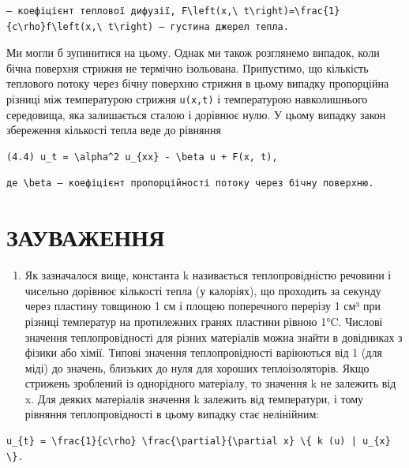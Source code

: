 \documentclass[
  ukrainian,
]{article}
\providecommand{\tightlist}{%
  \setlength{\itemsep}{0pt}\setlength{\parskip}{0pt}}
\begin{document}
\begin{verbatim}
— коефіцієнт теплової дифузії, F\left(x,\ t\right)=\frac{1}{c\rho}f\left(x,\ t\right) — густина джерел тепла.
\end{verbatim}

Ми могли б зупинитися на цьому. Однак ми також розглянемо випадок, коли
бічна поверхня стрижня не термічно ізольована. Припустимо, що кількість
теплового потоку через бічну поверхню стрижня в цьому випадку
пропорційна різниці між температурою стрижня \texttt{u(x,t)} і
температурою навколишнього середовища, яка залишається сталою і дорівнює
нулю. У цьому випадку закон збереження кількості тепла веде до рівняння

\begin{verbatim}
(4.4) u_t = \alpha^2 u_{xx} - \beta u + F(x, t),
\end{verbatim}

\begin{verbatim}
де \beta — коефіцієнт пропорційності потоку через бічну поверхню.
\end{verbatim}

\section{ЗАУВАЖЕННЯ}\label{ux437ux430ux443ux432ux430ux436ux435ux43dux43dux44f-3}

\begin{enumerate}
\def\labelenumi{\arabic{enumi}.}
\tightlist
\item
  Як зазначалося вище, константа k називається теплопровідністю речовини
  і чисельно дорівнює кількості тепла (у калоріях), що проходить за
  секунду через пластину товщиною 1 см і площею поперечного перерізу 1
  см³ при різниці температур на протилежних гранях пластини рівною 1°C.
  Числові значення теплопровідності для різних матеріалів можна знайти в
  довідниках з фізики або хімії. Типові значення теплопровідності
  варіюються від 1 (для міді) до значень, близьких до нуля для хороших
  теплоізоляторів. Якщо стрижень зроблений із однорідного матеріалу, то
  значення k не залежить від x. Для деяких матеріалів значення k
  залежить від температури, і тому рівняння теплопровідності в цьому
  випадку стає нелінійним:
\end{enumerate}

\begin{verbatim}
u_{t} = \frac{1}{c\rho} \frac{\partial}{\partial x} \{ k (u) | u_{x} \}.
\end{verbatim}
\end{document}
